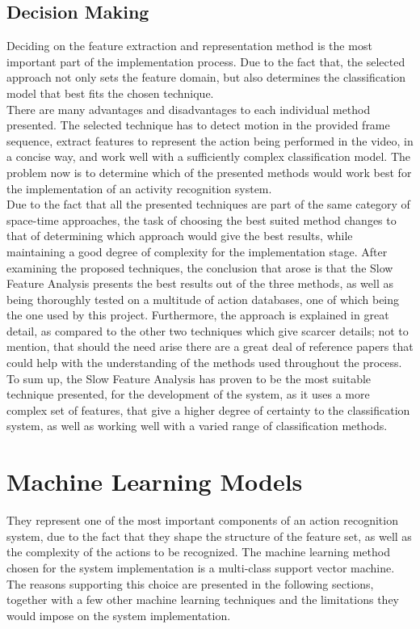 \documentclass[11pt]{report}
\begin{document}
\subsection{Decision Making}
Deciding on the feature extraction and representation method is the most important part of the implementation process. Due to the fact that, the selected approach not only sets the feature domain, but also determines the classification model that best fits the chosen technique.\\
There are many advantages and disadvantages to each individual method presented. The selected technique has to detect motion in the provided frame sequence, extract features to represent the action being performed in the video, in a concise way, and work well with a sufficiently complex classification model. The problem now is to determine which of the presented methods would work best for the implementation of an activity recognition system.\\
Due to the fact that all the presented techniques are part of the same category of space-time approaches, the task of choosing the best suited method changes to that of determining which approach would give the best results, while maintaining a good degree of complexity for the implementation stage. After examining the proposed techniques, the conclusion that arose is that the Slow Feature Analysis presents the best results out of the three methods, as well as being thoroughly tested on a multitude of action databases, one of which being the one used by this project. Furthermore, the approach is  explained in great detail, as compared to the other two techniques which give scarcer details; not to mention, that should the need arise there are a great deal of reference papers that could help with the understanding of the methods used throughout the process.\\
To sum up, the Slow Feature Analysis has proven to be the most suitable technique presented, for the development of the system, as it uses a more complex set of features, that give a higher degree of certainty to the classification system, as well as working well with a varied range of classification methods. \\  

\section{Machine Learning Models}
They represent one of the most important components of an action recognition system, due to the fact that they shape the structure of the feature set, as well as the complexity of the actions to be recognized. The machine learning method chosen for the system implementation is a multi-class support vector machine. The reasons supporting this choice are presented in the following sections, together with a few other machine learning techniques and the limitations they would impose on the system implementation. \\
\end{document}
